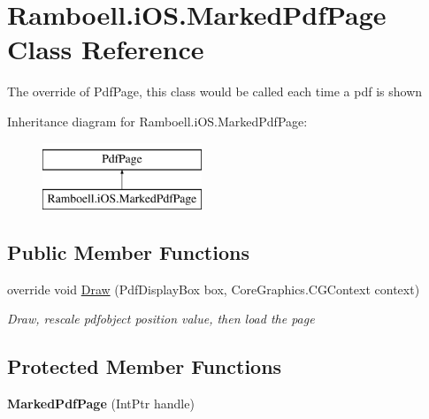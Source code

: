 \hypertarget{class_ramboell_1_1i_o_s_1_1_marked_pdf_page}{}\section{Ramboell.\+i\+O\+S.\+Marked\+Pdf\+Page Class Reference}
\label{class_ramboell_1_1i_o_s_1_1_marked_pdf_page}


The override of Pdf\+Page, this class would be called each time a pdf is shown  


Inheritance diagram for Ramboell.\+i\+O\+S.\+Marked\+Pdf\+Page\+:\begin{figure}[H]
\begin{center}
\leavevmode
\includegraphics[height=2.000000cm]{class_ramboell_1_1i_o_s_1_1_marked_pdf_page}
\end{center}
\end{figure}
\subsection*{Public Member Functions}
\begin{DoxyCompactItemize}
\item 
override void \hyperlink{class_ramboell_1_1i_o_s_1_1_marked_pdf_page_a65755814023826ac65bbeb51de0a57df}{Draw} (Pdf\+Display\+Box box, Core\+Graphics.\+C\+G\+Context context)
\begin{DoxyCompactList}\small\item\em Draw, rescale pdfobject position value, then load the page \end{DoxyCompactList}\end{DoxyCompactItemize}
\subsection*{Protected Member Functions}
\begin{DoxyCompactItemize}
\item 
\mbox{\label{class_ramboell_1_1i_o_s_1_1_marked_pdf_page_a78ef07fec21885b0efeac660cd9d9009}} 
{\bfseries Marked\+Pdf\+Page} (Int\+Ptr handle)
\end{DoxyCompactItemize}

